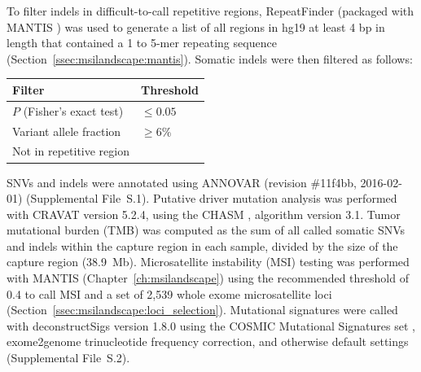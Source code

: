 \noindent To filter indels in difficult-to-call repetitive regions, RepeatFinder (packaged with MANTIS \cite{kautto17}) was used to generate a list of all regions in hg19 at least 4 bp in length that contained a 1 to 5-mer repeating sequence (Section~\ref{ssec:msilandscape:mantis}). Somatic indels were then filtered as follows:
\begin{table}[H]
	\centering
	\begin{tabular}{l|l}
		Filter                                   & Threshold  \\
		\hline
		$P$ (Fisher's exact test)                & $\le 0.05$ \\
		Variant allele fraction                  & $\ge 6\%$  \\
		Not in repetitive region & \\
	\end{tabular}
\end{table}

SNVs and indels were annotated using ANNOVAR \cite{annovar} (revision \#11f4bb, 2016-02-01) (Supplemental File~S\thechapter{}.1). Putative driver mutation analysis was performed with CRAVAT \cite{douville2013} version 5.2.4, using the CHASM \cite{carter2009}, algorithm version 3.1. Tumor mutational burden (TMB) was computed as the sum of all called somatic SNVs and indels within the capture region in each sample, divided by the size of the capture region (\textapprox{}38.9~Mb). Microsatellite instability (MSI) testing was performed with MANTIS \cite{kautto17} (Chapter~\ref{ch:msilandscape}) using the recommended threshold of 0.4 to call MSI and a set of 2,539 whole exome microsatellite loci (Section~\ref{ssec:msilandscape:loci_selection}). Mutational signatures were called with deconstructSigs \cite{rosenthal16} version 1.8.0 using the COSMIC Mutational Signatures set \cite{cosmic_ms}, exome2genome trinucleotide frequency correction, and otherwise default settings (Supplemental File~S\thechapter{}.2).

